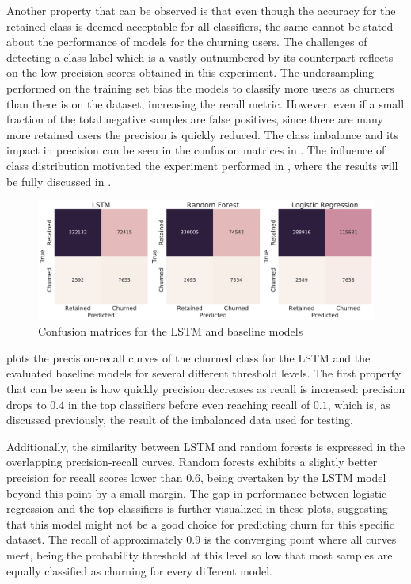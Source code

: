 \documentclass{kththesis}
\begin{document}
Another property that can be observed is that even though the accuracy for the retained class is deemed acceptable for all classifiers, the same cannot be stated about the performance of models for the churning users. The challenges of detecting a class label which is a vastly outnumbered by its counterpart reflects on the low precision scores obtained in this experiment. The undersampling performed on the training set bias the models to classify more users as churners than there is on the dataset, increasing the recall metric. However, even if a small fraction of the total negative samples are false positives, since there are many more retained users the precision is quickly reduced. The class imbalance and its impact in precision can be seen in the confusion matrices in . The influence of class distribution motivated the experiment performed in , where the results will be fully discussed in .

\begin{figure}[H]
    \centering
    \includegraphics[width=1.0\textwidth,keepaspectratio]{figures/cfm_temporal_static.pdf}
    \caption{Confusion matrices for the LSTM and baseline models}
    \label{fig:cfm_temporal_static}
\end{figure}

 plots the precision-recall curves of the churned class for the LSTM and the evaluated baseline models for several different threshold levels. The first property that can be seen is how quickly precision decreases as recall is increased: precision drops to $0.4$ in the top classifiers before even reaching recall of $0.1$, which is, as discussed previously, the result of the imbalanced data used for testing.  

Additionally, the similarity between LSTM and random forests is expressed in the overlapping precision-recall curves. Random forests exhibits a slightly better precision for recall scores lower than $0.6$, being overtaken by the LSTM model beyond this point by a small margin. The gap in performance between logistic regression and the top classifiers is further visualized in these plots, suggesting that this model might not be a good choice for predicting churn for this specific dataset. The recall of approximately $0.9$ is the converging point where all curves meet, being the probability threshold at this level so low that most samples are equally classified as churning for every different model.
\end{document}
